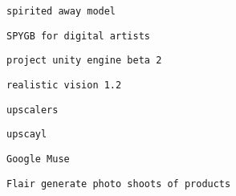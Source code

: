 \begin{verbatim}
spirited away model
\end{verbatim}
             

             
             
              \protect\hypertarget{ID_1903299411}{}{}

\begin{verbatim}
SPYGB for digital artists
\end{verbatim}
             

             
             
              \protect\hypertarget{ID_1809072941}{}{}

\begin{verbatim}
project unity engine beta 2
\end{verbatim}
             

             
             
              \protect\hypertarget{ID_311104028}{}{}

\begin{verbatim}
realistic vision 1.2
\end{verbatim}
             
           
         

         
         
          \protect\hypertarget{ID_737953265}{}{}

\begin{verbatim}
upscalers
\end{verbatim}

           
           
            \protect\hypertarget{ID_1026333075}{}{}

\begin{verbatim}
upscayl
\end{verbatim}
           
         

         
         
          \protect\hypertarget{ID_1605213866}{}{}

\begin{verbatim}
Google Muse
\end{verbatim}
         

         
         
          \protect\hypertarget{ID_1202289419}{}{}

\begin{verbatim}
Flair generate photo shoots of products
\end{verbatim}
         

